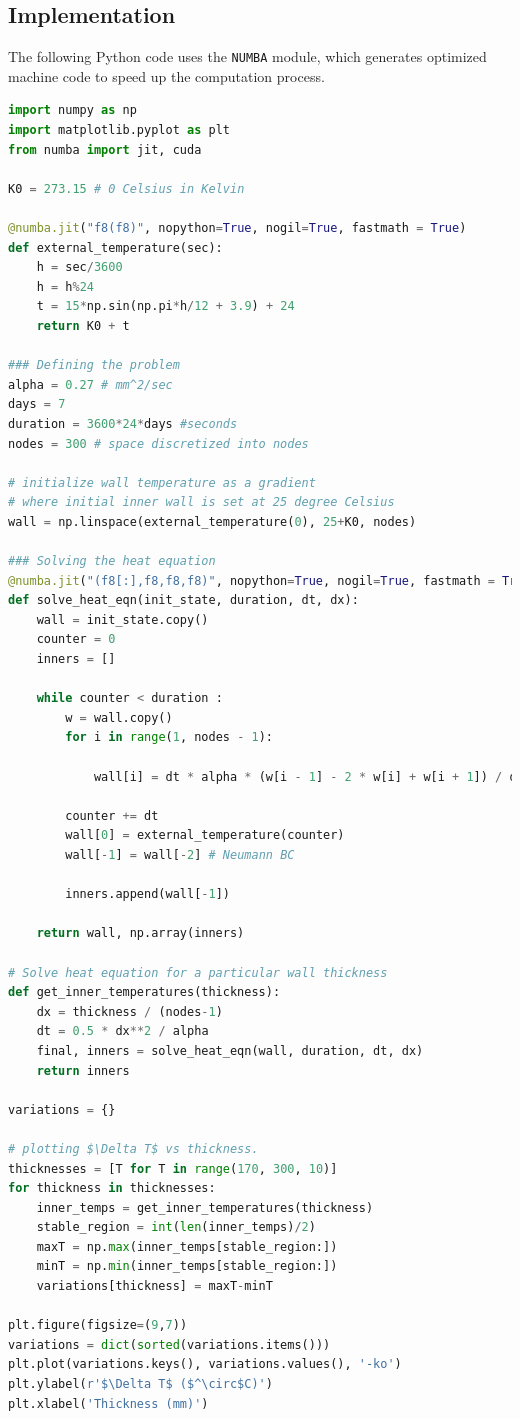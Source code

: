 \subsection{Implementation}
The following Python code uses the \verb|NUMBA| module, which generates optimized machine code to speed up the computation process.
\begin{lstlisting}[language=Python, caption=Finding the closest possible emission line to match with from the database]
import numpy as np
import matplotlib.pyplot as plt
from numba import jit, cuda

K0 = 273.15 # 0 Celsius in Kelvin

@numba.jit("f8(f8)", nopython=True, nogil=True, fastmath = True)
def external_temperature(sec):
    h = sec/3600
    h = h%24
    t = 15*np.sin(np.pi*h/12 + 3.9) + 24
    return K0 + t

### Defining the problem
alpha = 0.27 # mm^2/sec
days = 7
duration = 3600*24*days #seconds
nodes = 300 # space discretized into nodes 

# initialize wall temperature as a gradient
# where initial inner wall is set at 25 degree Celsius
wall = np.linspace(external_temperature(0), 25+K0, nodes) 

### Solving the heat equation
@numba.jit("(f8[:],f8,f8,f8)", nopython=True, nogil=True, fastmath = True, cache=True)
def solve_heat_eqn(init_state, duration, dt, dx):
    wall = init_state.copy()
    counter = 0
    inners = []
    
    while counter < duration :
        w = wall.copy()
        for i in range(1, nodes - 1):

            wall[i] = dt * alpha * (w[i - 1] - 2 * w[i] + w[i + 1]) / dx ** 2 + w[i]

        counter += dt
        wall[0] = external_temperature(counter)
        wall[-1] = wall[-2] # Neumann BC
        
        inners.append(wall[-1])
        
    return wall, np.array(inners)

# Solve heat equation for a particular wall thickness
def get_inner_temperatures(thickness):
    dx = thickness / (nodes-1)
    dt = 0.5 * dx**2 / alpha
    final, inners = solve_heat_eqn(wall, duration, dt, dx)
    return inners   

variations = {}

# plotting $\Delta T$ vs thickness.
thicknesses = [T for T in range(170, 300, 10)]
for thickness in thicknesses:
    inner_temps = get_inner_temperatures(thickness)
    stable_region = int(len(inner_temps)/2)
    maxT = np.max(inner_temps[stable_region:])
    minT = np.min(inner_temps[stable_region:])
    variations[thickness] = maxT-minT

plt.figure(figsize=(9,7))
variations = dict(sorted(variations.items()))
plt.plot(variations.keys(), variations.values(), '-ko')
plt.ylabel(r'$\Delta T$ ($^\circ$C)')
plt.xlabel('Thickness (mm)')
\end{lstlisting}

